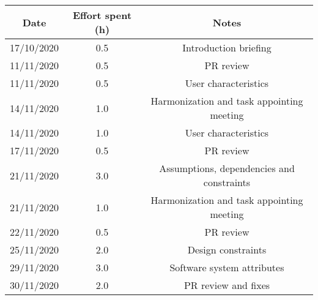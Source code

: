 \documentclass[../../main.tex]{subfiles}
\begin{document}
\begin{center}
    \begin{tabular}{|c| |c| |c|} 
        \hline
        Date & Effort spent (h) & Notes\\ [0.5ex] 
        \hline\hline
        17/10/2020 & 0.5 & Introduction briefing\\ 
        11/11/2020 & 0.5 & PR review\\
        11/11/2020 & 0.5 & User characteristics\\
        14/11/2020 & 1.0 & Harmonization and task appointing meeting\\
        14/11/2020 & 1.0 & User characteristics\\
        17/11/2020 & 0.5 & PR review\\
        21/11/2020 & 3.0 & Assumptions, dependencies and constraints\\
        21/11/2020 & 1.0 & Harmonization and task appointing meeting\\
        22/11/2020 & 0.5 & PR review\\
        25/11/2020 & 2.0 & Design constraints\\
        29/11/2020 & 3.0 & Software system attributes\\
        30/11/2020 & 2.0 & PR review and fixes\\
        
        \hline
    \end{tabular}
\end{center}
\end{document}
